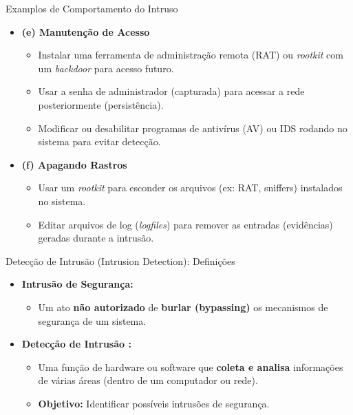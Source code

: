 \begin{frame}{Examplos de Comportamento do Intruso}
    \begin{itemize}
        \item \textbf{(e) Manutenção de Acesso }
              \begin{itemize}
                  \item Instalar uma ferramenta de administração remota (RAT) ou \textit{rootkit} com um \textit{backdoor} para acesso futuro.
                  \item Usar a senha de administrador (capturada) para acessar a rede posteriormente (persistência).
                  \item Modificar ou desabilitar programas de antivírus (AV) ou IDS rodando no sistema para evitar detecção.
              \end{itemize}

        \item \textbf{(f) Apagando Rastros }
              \begin{itemize}
                  \item Usar um \textit{rootkit} para esconder os arquivos (ex: RAT, sniffers) instalados no sistema.
                  \item Editar arquivos de log (\textit{logfiles}) para remover as entradas (evidências) geradas durante a intrusão.
              \end{itemize}
    \end{itemize}
\end{frame}

\begin{frame}{Detecção de Intrusão (Intrusion Detection): Definições}
    \begin{itemize}
        \item \textbf{Intrusão de Segurança:}
              \begin{itemize}
                  \item Um ato \textbf{não autorizado} de \textbf{burlar (bypassing)} os mecanismos de segurança de um sistema.
              \end{itemize}

        \item \textbf{Detecção de Intrusão :}
              \begin{itemize}
                  \item Uma função de hardware ou software que \textbf{coleta e analisa} informações de várias áreas (dentro de um computador ou rede).
                  \item \textbf{Objetivo:} Identificar possíveis intrusões de segurança.
              \end{itemize}
    \end{itemize}
\end{frame}

